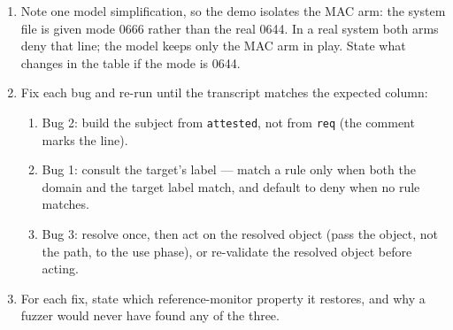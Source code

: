 \documentclass[12pt]{Training}
\begin{document}
\begin{enumerate}
    \item Note one model simplification, so the demo isolates the MAC arm: the system file is given mode 0666 rather than the real 0644. In a real system both arms deny that line; the model keeps only the MAC arm in play. State what changes in the table if the mode is 0644.
    \item Fix each bug and re-run until the transcript matches the expected column:
    \begin{enumerate}
        \item Bug 2: build the subject from \lstinline{attested}, not from \lstinline{req} (the comment marks the line).
        \item Bug 1: consult the target's label --- match a rule only when both the domain and the target label match, and default to deny when no rule matches.
        \item Bug 3: resolve once, then act on the resolved object (pass the object, not the path, to the use phase), or re-validate the resolved object before acting.
    \end{enumerate}
    \item For each fix, state which reference-monitor property it restores, and why a fuzzer would never have found any of the three.
\end{enumerate}
\end{document}
